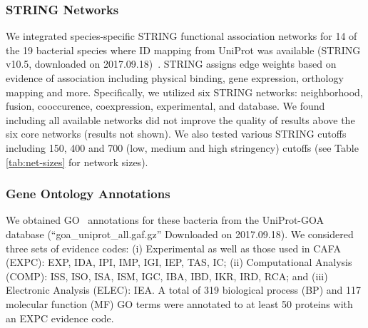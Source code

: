 \subsubsection{STRING Networks}
\label{sec:string}
We integrated species-specific STRING functional association networks for 14 of the 19 bacterial species where ID mapping from UniProt was available (STRING v10.5, downloaded on 2017.09.18)~\cite{szklarczyk-mering-string-v10.5-nar-2017}.
STRING assigns edge weights based on evidence of association including physical binding, gene expression, orthology mapping and more. 
Specifically, we utilized six STRING networks: neighborhood, fusion, cooccurence, coexpression, experimental, and database.
We found including all available networks did not improve the quality of results above the six core networks (results not shown).
We also tested various STRING cutoffs including 150, 400 and 700 (low, medium and high stringency) cutoffs (see Table \ref{tab:net-sizes} for network sizes). 



\subsubsection{Gene Ontology Annotations}
\label{sec:goa}
We obtained GO~\cite{gene-ontology-consortium-go-expansion-nar-2017} annotations for these bacteria from the UniProt-GOA database (``goa\_uniprot\_all.gaf.gz'' Downloaded on 2017.09.18).
%
We considered three sets of evidence codes: (i) Experimental as well as those used in CAFA (EXPC): EXP, IDA, IPI, IMP, IGI, IEP, TAS, IC; (ii) Computational Analysis (COMP): ISS, ISO, ISA, ISM, IGC, IBA, IBD, IKR, IRD, RCA; and (iii) Electronic Analysis (ELEC): IEA.
A total of 319 biological process (BP) and 117 molecular function (MF) GO terms were annotated to at least 50 proteins with an EXPC evidence code.

